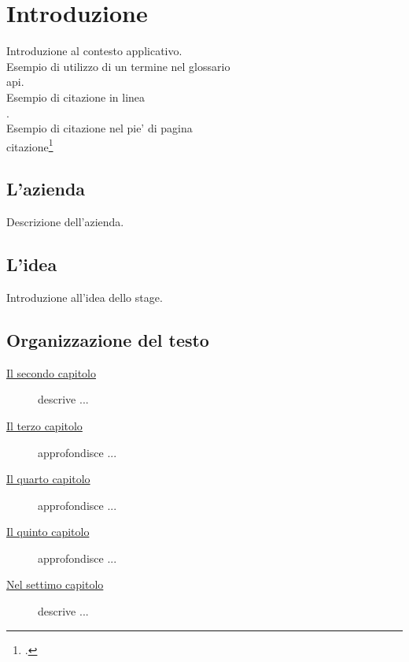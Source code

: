 \chapter{Introduzione}
\label{cap:1introduzione}

Introduzione al contesto applicativo.\\

\noindent Esempio di utilizzo di un termine nel glossario \\
\gls{api}. \\

\noindent Esempio di citazione in linea \\
\cite{site:agile-manifesto}. \\

\noindent Esempio di citazione nel pie' di pagina \\
citazione\footcite{womak:lean-thinking} \\

\section{L'azienda}

Descrizione dell'azienda.

\section{L'idea}

Introduzione all'idea dello stage.

\section{Organizzazione del testo}

\begin{description}
    \item[{\hyperref[cap:descrizione-stage]{Il secondo capitolo}}] descrive ...
    
    \item[{\hyperref[cap:analisi-requisiti]{Il terzo capitolo}}] approfondisce ...
    
    \item[{\hyperref[cap:introduzione-teorica]{Il quarto capitolo}}] approfondisce ...
    
    \item[{\hyperref[cap:implementazione-risultati]{Il quinto capitolo}}] approfondisce ...
        
    \item[{\hyperref[cap:conclusioni]{Nel settimo capitolo}}] descrive ...
\end{description}

